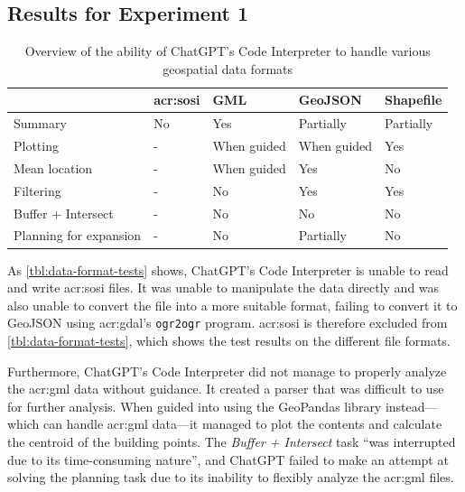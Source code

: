 \subsection{Results for Experiment 1}\label{subsec:experiment-1-results}

\begin{table}
    \centering
    \begin{tabular}{l|p{}p{}p{}p{}}
        \toprule
                               & \textbf{\acrshort{acr:sosi}} & \textbf{GML} & \textbf{GeoJSON} & \textbf{Shapefile} \\
        \midrule
        Summary                & No                           & Yes          & Partially        & Partially          \\
        Plotting               & -                            & When guided  & When guided      & Yes                \\
        Mean location          & -                            & When guided  & Yes              & No                 \\
        Filtering              & -                            & No           & Yes              & Yes                \\
        Buffer + Intersect     & -                            & No           & No               & No                 \\
        Planning for expansion & -                            & No           & Partially        & No                 \\
        \bottomrule
    \end{tabular}
    \caption{Overview of the ability of ChatGPT's Code Interpreter to handle various geospatial data formats}
    \label{tbl:data-format-tests}
\end{table}

As \autoref{tbl:data-format-tests} shows, ChatGPT's Code Interpreter is unable to read and write \acrshort{acr:sosi} files. It was unable to manipulate the data directly and was also unable to convert the file into a more suitable format, failing to convert it to GeoJSON using \acrshort{acr:gdal}'s \texttt{ogr2ogr} program. \acrshort{acr:sosi} is therefore excluded from \autoref{tbl:data-format-tests}, which shows the test results on the different file formats.

Furthermore, ChatGPT's Code Interpreter did not manage to properly analyze the \acrshort{acr:gml} data without guidance. It created a parser that was difficult to use for further analysis. When guided into using the GeoPandas library instead---which can handle \acrshort{acr:gml} data---it managed to plot the contents and calculate the centroid of the building points. The \textit{Buffer + Intersect} task \enquote{was interrupted due to its time-consuming nature}, and ChatGPT failed to make an attempt at solving the planning task due to its inability to flexibly analyze the \acrshort{acr:gml} files.

